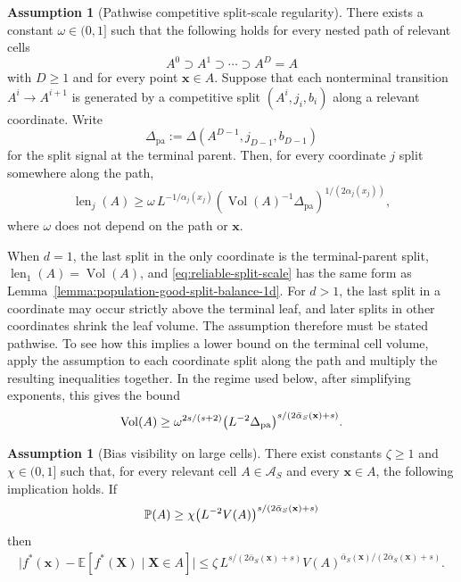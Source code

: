\documentclass[11pt]{article}
\theoremstyle{plain}
\theoremstyle{definition}
\newtheorem{assumption}[theorem]{Assumption}
\theoremstyle{remark}
\theoremstyle{plain}
\newcommand{\bx}{\mathbf{x}}
\newcommand{\bX}{\mathbf{X}}
\DeclarePairedDelimiter{\paren}{(}{)}
\renewcommand{\P}{\mathbb{P}}
\newcommand{\E}{\mathbb{E}}
\DeclareMathOperator{\Vol}{Vol}
\DeclareMathOperator{\len}{len}
\newcommand{\1}{\mathbbm{1}}
\begin{document}
\begin{assumption}[Pathwise competitive split-scale regularity]
\label{assum:reliable-split-balance}
There exists a constant $\omega\in(0,1]$ such that the following holds for every nested path of relevant cells
\[
A^0\supset A^1\supset\cdots\supset A^D=A
\]
with $D\ge1$ and for every point $\bx\in A$.
Suppose that each nonterminal transition $A^i\to A^{i+1}$ is generated by a competitive split $(A^i,j_i,b_i)$ along a relevant coordinate. Write
\[
\Delta_{\mathrm{pa}}
:=
\Delta(A^{D-1},j_{D-1},b_{D-1})
\]
for the split signal at the terminal parent. Then, for every coordinate $j$ split somewhere along the path,
\begin{align}
\label{eq:reliable-split-scale}
\len_j(A)
\ge
\omega\,
L^{-1/\alpha_j(x_j)}
\left(
\Vol(A)^{-1}\Delta_{\mathrm{pa}}
\right)^{1/(2\alpha_j(x_j))},
\end{align}
where $\omega$ does not depend on the path or $\bx$.
\end{assumption}

When $d=1$, the last split in the only coordinate is the terminal-parent split, $\len_1(A)=\Vol(A)$, and \eqref{eq:reliable-split-scale} has the same form as Lemma~\ref{lemma:population-good-split-balance-1d}.
For $d>1$, the last split in a coordinate may occur strictly above the terminal leaf, and later splits in other coordinates shrink the leaf volume. The assumption therefore must be stated pathwise.
To see how this implies a lower bound on the terminal cell volume, apply the assumption to each coordinate split along the path and multiply the resulting inequalities together.
In the regime used below, after simplifying exponents, this gives the bound
\[
\Vol(A)
\geq
\omega^{2s/(s+2)}
\paren*{L^{-2}\Delta_{\mathrm{pa}}}^{
s/(2\bar\alpha_S(\bx)+s)}.
\]

\begin{assumption}[Bias visibility on large cells]
\label{assum:variance-oscillation}
There exist constants $\zeta\ge1$ and $\chi\in(0,1]$ such that, for every relevant cell $A\in\mathcal A_S$ and every $\bx\in A$, the following implication holds.
If
\[
\P(A)\ge \chi\paren*{L^{-2}V(A)}^{
s/(2\bar\alpha_S(\bx)+s)
}
\]
then
\begin{align}
\label{eq:bias-visibility}
\bigl|f^*(\bx)-\E[f^*(\bX)\mid \bX\in A]\bigr|
\le
\zeta\,
L^{s/(2\bar\alpha_S(\bx)+s)}
V(A)^{
\bar\alpha_S(\bx)/(2\bar\alpha_S(\bx)+s)}.
\end{align}
\end{assumption}
\end{document}
